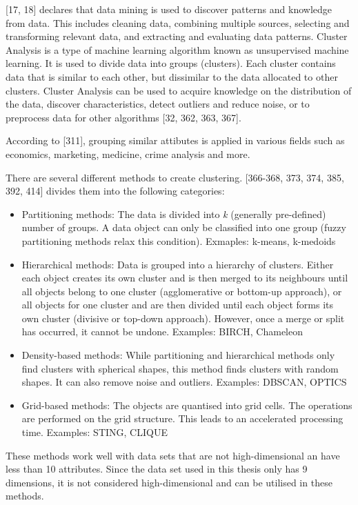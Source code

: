 \documentclass[12pt,a4paper]{article}
\begin{document}
\textcite{han2011data}[17, 18] declares that data mining is used to discover patterns and knowledge from data. This includes cleaning data, combining multiple sources, selecting and transforming relevant data, and extracting and evaluating data patterns.
Cluster Analysis is a type of machine learning algorithm known as unsupervised machine learning. It is used to divide data into groups (clusters). Each cluster contains data that is similar to each other, but dissimilar to the data allocated to other clusters. Cluster Analysis can be used to acquire knowledge on the distribution of the data, discover characteristics, detect outliers and reduce noise, or to preprocess data for other algorithms \autocite{han2011data}[32, 362, 363, 367].

According to \textcite{bramer2007principles}[311], grouping similar attibutes is applied in various fields such as economics, marketing, medicine, crime analysis and more.




There are several different methods to create clustering. \textcite{han2011data}[366-368, 373, 374, 385, 392, 414]  divides them into the following categories:
\begin{itemize}
	\item Partitioning methods: The data is divided into \textit{k} (generally pre-defined) number of groups. A data object can only be classified into one group (fuzzy partitioning methods relax this condition). Exmaples: k-means, k-medoids
	\item Hierarchical methods: Data is grouped into a hierarchy of clusters. Either each object creates its own cluster and is then merged to its neighbours until all objects belong to one cluster (agglomerative or bottom-up approach), or all objects for one cluster and are then divided until each object forms its own cluster (divisive or top-down approach). However, once a merge or split has occurred, it cannot be undone. Examples: BIRCH, Chameleon
	\item Density-based methods: While partitioning and hierarchical methods only find clusters with spherical shapes, this method finds clusters with random shapes. It can also remove noise and outliers. Examples: DBSCAN, OPTICS
	\item Grid-based methods: The objects are quantised into grid cells. The operations are performed on the grid structure. This leads to an accelerated processing time. Examples: STING, CLIQUE
\end{itemize}
These methods work well with data sets that are not high-dimensional an have less than 10 attributes. Since the data set used in this thesis only has 9 dimensions, it is not considered high-dimensional and can be utilised in these methods.
\end{document}
